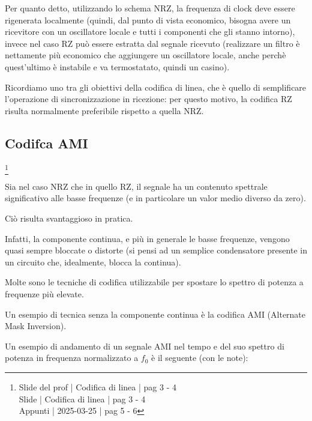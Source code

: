 Per quanto detto, utilizzando lo schema NRZ, 
la frequenza di clock deve essere rigenerata localmente (quindi, dal punto di vista economico, bisogna avere un ricevitore con un oscillatore locale e tutti i componenti che gli stanno intorno), 
invece nel caso RZ può essere estratta dal segnale ricevuto (realizzare un filtro è nettamente più economico che aggiungere un oscillatore locale, anche perchè quest'ultimo è instabile e va termostatato, quindi un casino). \newline 

Ricordiamo uno tra gli obiettivi della codifica di linea, che è quello di semplificare l'operazione di sincronizzazione in ricezione: 
per questo motivo, la codifica RZ risulta normalmente preferibile rispetto a quella NRZ. \newline 

\newpage 

\subsection{Codifca AMI}
\footnote{Slide del prof | Codifica di linea | pag 3 - 4\\
Slide | Codifica di linea | pag  3 - 4\\  
Appunti | 2025-03-25 | pag 5 - 6
}

Sia nel caso NRZ che in quello RZ, il segnale ha un contenuto spettrale significativo alle basse frequenze (e in particolare un valor medio diverso da zero). \newline 

Ciò risulta svantaggioso in pratica. \newline 

Infatti, la componente continua, e più in generale le basse frequenze, vengono quasi sempre bloccate o distorte (si pensi ad un semplice condensatore presente in un circuito che, idealmente, blocca la continua). \newline 

Molte sono le tecniche di codifica utilizzabile per spostare lo spettro di potenza a frequenze più elevate. \newline 

Un esempio di tecnica senza la componente continua è la codifica AMI (Alternate Mask Inversion). \newline 

Un esempio di andamento di un segnale AMI nel tempo e del suo spettro di potenza in frequenza normalizzato a $f_0$ è il seguente (con le note): 

